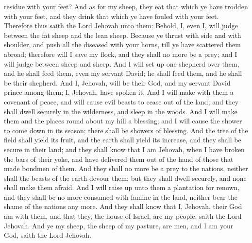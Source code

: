 residue with your feet? And as for my sheep, they eat that which ye have trodden with your feet, and they drink that which ye have fouled with your feet.  Therefore thus saith the Lord Jehovah unto them: Behold, I, even I, will judge between the fat sheep and the lean sheep. Because ye thrust with side and with shoulder, and push all the diseased with your horns, till ye have scattered them abroad; therefore will I save my flock, and they shall no more be a prey; and I will judge between sheep and sheep. And I will set up one shepherd over them, and he shall feed them, even my servant David; he shall feed them, and he shall be their shepherd. And I, Jehovah, will be their God, and my servant David prince among them; I, Jehovah, have spoken it.  And I will make with them a covenant of peace, and will cause evil beasts to cease out of the land; and they shall dwell securely in the wilderness, and sleep in the woods. And I will make them and the places round about my hill a blessing; and I will cause the shower to come down in its season; there shall be showers of blessing. And the tree of the field shall yield its fruit, and the earth shall yield its increase, and they shall be secure in their land; and they shall know that I am Jehovah, when I have broken the bars of their yoke, and have delivered them out of the hand of those that made bondmen of them. And they shall no more be a prey to the nations, neither shall the beasts of the earth devour them; but they shall dwell securely, and none shall make them afraid. And I will raise up unto them a plantation for renown, and they shall be no more consumed with famine in the land, neither bear the shame of the nations any more. And they shall know that I, Jehovah, their God am with them, and that they, the house of Israel, are my people, saith the Lord Jehovah. And ye my sheep, the sheep of my pasture, are men, and I am your God, saith the Lord Jehovah. 

